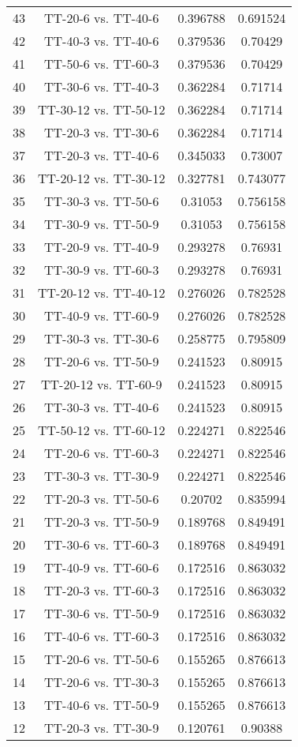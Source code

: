 \documentclass[a4paper,10pt]{article}
\begin{document}
\begin{landscape}
\begin{table}[!htp]
\begin{tabular}{cccc}
43&TT-20-6 vs. TT-40-6&0.396788&0.691524\\
42&TT-40-3 vs. TT-40-6&0.379536&0.70429\\
41&TT-50-6 vs. TT-60-3&0.379536&0.70429\\
40&TT-30-6 vs. TT-40-3&0.362284&0.71714\\
39&TT-30-12 vs. TT-50-12&0.362284&0.71714\\
38&TT-20-3 vs. TT-30-6&0.362284&0.71714\\
37&TT-20-3 vs. TT-40-6&0.345033&0.73007\\
36&TT-20-12 vs. TT-30-12&0.327781&0.743077\\
35&TT-30-3 vs. TT-50-6&0.31053&0.756158\\
34&TT-30-9 vs. TT-50-9&0.31053&0.756158\\
33&TT-20-9 vs. TT-40-9&0.293278&0.76931\\
32&TT-30-9 vs. TT-60-3&0.293278&0.76931\\
31&TT-20-12 vs. TT-40-12&0.276026&0.782528\\
30&TT-40-9 vs. TT-60-9&0.276026&0.782528\\
29&TT-30-3 vs. TT-30-6&0.258775&0.795809\\
28&TT-20-6 vs. TT-50-9&0.241523&0.80915\\
27&TT-20-12 vs. TT-60-9&0.241523&0.80915\\
26&TT-30-3 vs. TT-40-6&0.241523&0.80915\\
25&TT-50-12 vs. TT-60-12&0.224271&0.822546\\
24&TT-20-6 vs. TT-60-3&0.224271&0.822546\\
23&TT-30-3 vs. TT-30-9&0.224271&0.822546\\
22&TT-20-3 vs. TT-50-6&0.20702&0.835994\\
21&TT-20-3 vs. TT-50-9&0.189768&0.849491\\
20&TT-30-6 vs. TT-60-3&0.189768&0.849491\\
19&TT-40-9 vs. TT-60-6&0.172516&0.863032\\
18&TT-20-3 vs. TT-60-3&0.172516&0.863032\\
17&TT-30-6 vs. TT-50-9&0.172516&0.863032\\
16&TT-40-6 vs. TT-60-3&0.172516&0.863032\\
15&TT-20-6 vs. TT-50-6&0.155265&0.876613\\
14&TT-20-6 vs. TT-30-3&0.155265&0.876613\\
13&TT-40-6 vs. TT-50-9&0.155265&0.876613\\
12&TT-20-3 vs. TT-30-9&0.120761&0.90388\\

\end{tabular}
\end{table}
\end{landscape}
\end{document}
